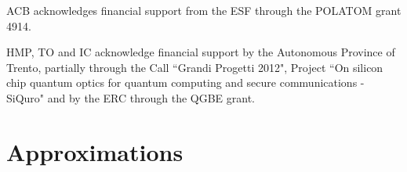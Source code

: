 \documentclass[twocolumn, 10pt, aps, superscriptaddress, floatfix, showpacs, pra, citeautoscript]{revtex4-1}
\begin{document}
\acknowledgments

ACB acknowledges financial support from the ESF through the POLATOM grant 4914.

HMP, TO and IC acknowledge financial support by the Autonomous Province of Trento, partially through the Call ``Grandi Progetti 2012", Project ``On silicon chip quantum optics for quantum computing and secure communications - SiQuro" and by the ERC through the QGBE grant.





\appendix

\section{Approximations}\label{app:approximations}
\end{document}
